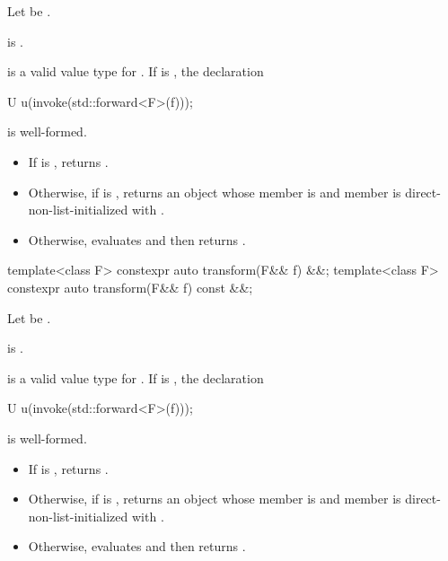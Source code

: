\begin{itemdescr}
\pnum
Let  be .

\pnum
\constraints
{} is .

\pnum
\mandates
{} is a valid value type for . If  is
, the declaration
\begin{codeblock}
U u(invoke(std::forward<F>(f)));
\end{codeblock}
is well-formed.

\pnum
\effects
\begin{itemize}
\item
If  is , returns
.
\item
Otherwise, if  is , returns an
 object whose  member is  and
 member is direct-non-list-initialized with
.
\item
Otherwise, evaluates  and then returns
.
\end{itemize}
\end{itemdescr}

%
\begin{itemdecl}
template<class F> constexpr auto transform(F&& f) &&;
template<class F> constexpr auto transform(F&& f) const &&;
\end{itemdecl}

\begin{itemdescr}
\pnum
Let  be .

\pnum
\constraints
{} is .

\pnum
\mandates
{} is a valid value type for . If  is
, the declaration
\begin{codeblock}
U u(invoke(std::forward<F>(f)));
\end{codeblock}
is well-formed.

\pnum
\effects
\begin{itemize}
\item
If  is , returns
.
\item
Otherwise, if  is , returns an
 object whose  member is  and
 member is direct-non-list-initialized with
.
\item
Otherwise, evaluates  and then returns
.
\end{itemize}
\end{itemdescr}

